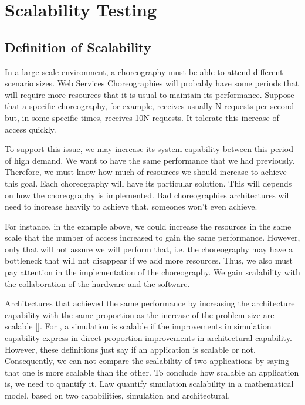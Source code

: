 \section{Scalability Testing}

\subsection{Definition of Scalability}
In a large scale environment, a choreography must be able to attend different scenario sizes. Web Services Choreographies will probably have some periods that will require more resources that it is usual to maintain its performance.  Suppose that a specific choreography, for example, receives usually N requests per second but, in some specific times, receives 10N requests. It tolerate this increase of access quickly.

To support this issue, we may increase its system capability between this period of high demand. We want to have the same performance that we had previously. Therefore, we must know how much of resources we should increase to achieve this goal.  Each choreography will have its particular solution. This will depends on how the choreography is implemented. Bad choreographies architectures will need to increase heavily to achieve that, someones won't even achieve.

For instance, in the example above, we could increase the resources in the same scale that the number of access increased to gain the same performance. However, only that will not assure we will perform that, i.e.  the choreography may have a bottleneck that will not disappear if we add more resources. Thus, we also must pay attention in the implementation of the choreography. We gain scalability with the collaboration of the hardware and the software. 

Architectures that achieved the same performance by increasing the architecture capability with the same proportion as the increase of the problem size are scalable [\citet{QUINN}]. For \citet{LAW}, a simulation is scalable if the improvements in simulation capability express in direct proportion improvements in architectural capability. However, these definitions just say if an application is scalable or not. Consequently, we can not compare the scalability of two applications by saying that one is more scalable than the other. To conclude how scalable an application is, we need to quantify it. Law quantify simulation scalability in a mathematical model, based on two capabilities, simulation and architectural. 

